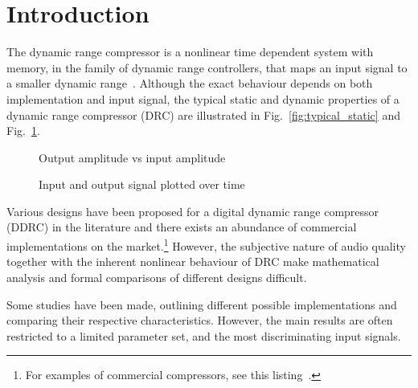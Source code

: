 \documentclass[../main2.tex]{subfiles}
\providecommand{\rootdir}{..}
\begin{document}
\section{Introduction}
The dynamic range compressor is a nonlinear time dependent system with memory, in the family of dynamic range controllers, that maps an input signal to a smaller dynamic range~\cite{dafx11}. Although the exact behaviour depends on both implementation and input signal, the typical static and dynamic properties of a dynamic range compressor (DRC) are illustrated in Fig.~\ref{fig:typical_static} and Fig.~\ref{fig:typical_envelope}.

\begin{figure}[ht]
\captionsetup{justification=centering}

\begin{minipage}[t]{.5\textwidth}
 \centering

\caption{Output amplitude vs input amplitude} 
\label{fig:typical_static}
\end{minipage}%
\begin{minipage}[t]{.5\textwidth}
\centering

\caption{Input and output signal plotted over time} 
\label{fig:typical_envelope}
\end{minipage}
\end{figure}

Various designs have been proposed for a digital dynamic range compressor (DDRC) in the literature and there exists an abundance of commercial implementations on the market.\footnote{For examples of commercial compressors, see this listing~\cite{commercial}.} However, the subjective nature of audio quality together with the inherent nonlinear behaviour of DRC make mathematical analysis and formal comparisons of different designs difficult.

Some studies have been made, outlining different possible implementations and comparing their respective characteristics. However, the main results are often restricted to a limited parameter set, and the most discriminating input signals.


\end{document}
